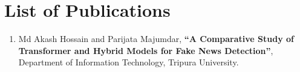 \sloppy
\pagestyle{fancy}
\chapter*{\centering List of Publications}

\begin{enumerate}
\item Md Akash Hossain and Parijata Majumdar, \textbf{``A Comparative Study of Transformer and Hybrid Models for Fake News Detection''}, Department of Information Technology, Tripura University.
\end{enumerate}
